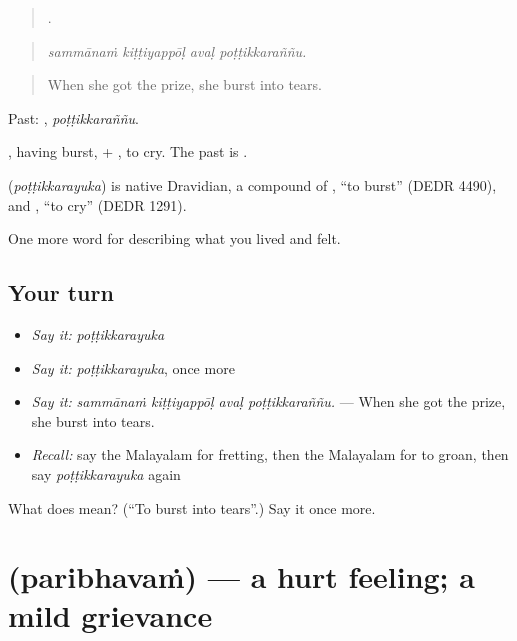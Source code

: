 \begin{quote}
   .
\end{quote}

\begin{quote}
\emph{sammānaṁ kiṭṭiyappōḷ avaḷ poṭṭikkaraññu.}
\end{quote}

\begin{quote}
When she got the prize, she burst into tears.
\end{quote}

Past: , \emph{poṭṭikkaraññu}.

, having burst, + , to cry. The past is .

\begin{cousinweb}
\textbf{} (\emph{poṭṭikkarayuka}) is native Dravidian, a compound of , \textquotedblleft{}to burst\textquotedblright{} (DEDR 4490), and , \textquotedblleft{}to cry\textquotedblright{} (DEDR 1291).
\end{cousinweb}

\begin{grammarlens}[title={What you've built}]
One more word for describing what you lived and felt.
\end{grammarlens}

\subsection*{Your turn}
\begin{itemize}
\raggedright
  \item \emph{Say it:} \emph{poṭṭikkarayuka}
  \item \emph{Say it:} \emph{poṭṭikkarayuka}, once more
  \item \emph{Say it:} \emph{sammānaṁ kiṭṭiyappōḷ avaḷ poṭṭikkaraññu.} — When she got the prize, she burst into tears.
  \item \emph{Recall:} say the Malayalam for fretting, then the Malayalam for to groan, then say \emph{poṭṭikkarayuka} again
\end{itemize}

\begin{tcolorbox}[breakable,colback=teal!4,colframe=teal!35!black,title={Before you move on}]
What does  mean? (\textquotedblleft{}To burst into tears\textquotedblright{}.) Say it once more.
\end{tcolorbox}
\section[\texorpdfstring{\ml{പരിഭവം} (paribhavaṁ)}{പരിഭവം (paribhavaṁ)}]{ (paribhavaṁ) — a hurt feeling; a mild grievance}

